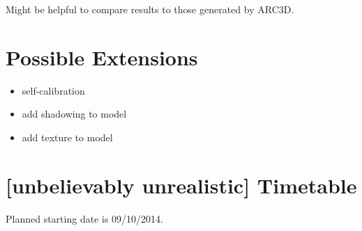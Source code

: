  Might be helpful to compare results to those generated by ARC3D.
 
\section*{Possible Extensions}
\begin{itemize}
\item self-calibration
\item add shadowing to model
\item add texture to model
\end{itemize}

\section*{[unbelievably unrealistic] Timetable}

Planned starting date is 09/10/2014.

